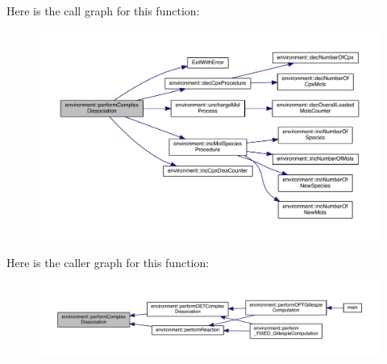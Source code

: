 Here is the call graph for this function\-:\nopagebreak
\begin{figure}[H]
\begin{center}
\leavevmode
\includegraphics[width=350pt]{a00014_a5c5e57b0558067cbf55c894f33d0a121_cgraph}
\end{center}
\end{figure}




Here is the caller graph for this function\-:\nopagebreak
\begin{figure}[H]
\begin{center}
\leavevmode
\includegraphics[width=350pt]{a00014_a5c5e57b0558067cbf55c894f33d0a121_icgraph}
\end{center}
\end{figure}


